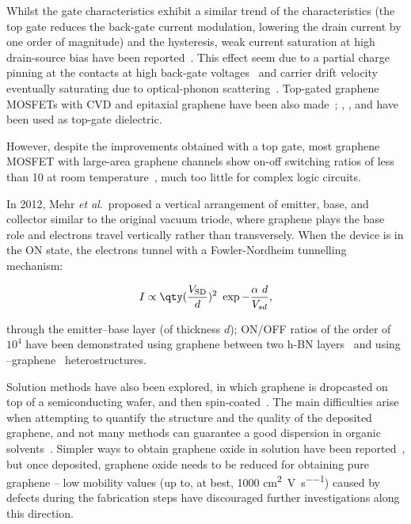 Whilst the gate characteristics exhibit a similar trend of the characteristics (the top gate reduces the back-gate current modulation, lowering the drain current by one order of magnitude) and the hysteresis, weak current saturation at high drain-source bias have been reported~\cite{moon2009epitaxial}.
This effect seem due to a partial charge pinning at the contacts at high back-gate voltages~\cite{di2011charge} and carrier drift velocity eventually saturating due to optical-phonon scattering~\cite{meric2008current}. Top-gated graphene \glspl{MOSFET} with CVD and epitaxial graphene have been also made~\cite{kedzierski2008epitaxial, lin2010100}; , , and  have been  used as top-gate dielectric.

However, despite the improvements obtained with a top gate, most graphene \gls{MOSFET} with large-area graphene channels show on-off switching ratios of less than 10 at room temperature~\cite{schwierz2010graphene}, much too little for complex logic circuits.

In 2012, Mehr \textit{et al}.\ proposed a vertical arrangement of emitter, base, and collector similar to the original vacuum triode, where graphene plays the base role and electrons travel vertically rather than transversely.
When the device is in the ON state, the electrons tunnel with a Fowler-Nordheim tunnelling mechanism:

\begin{equation}
    I\propto\qty(\frac{V_\textrm{SD}}{d})^2~\exp{-\frac{\alpha~d}{V_{sd}}},
\end{equation}

through the emitter--base layer (of thickness $d$); ON/OFF ratios of the order of $10^4$ have been demonstrated using graphene between two h-BN layers~\cite{britnell2012field} and using --graphene~\cite{georgiou2013vertical} heterostructures.

Solution methods have also been explored, in which graphene is dropcasted on top of a semiconducting wafer, and then spin-coated~\cite{liu2010simple}.
The main difficulties arise when attempting to quantify the structure and the quality of the deposited graphene, and not many methods can guarantee a good dispersion in organic solvents~\cite{sun2011graphene}.
Simpler ways to obtain graphene oxide in solution have been reported~\cite{van2016effect}, but once deposited, graphene oxide needs to be reduced for obtaining pure graphene -- low mobility values (up to, at best, 1000 \si{\square\centi\metre\per\volt\per\second}) caused by defects during the fabrication steps have discouraged further investigations along this direction.

